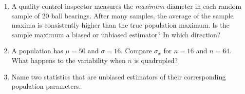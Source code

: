 \documentclass[10pt]{article}
\begin{document}
\namedateperiod

\vspace{0.15in}

\begin{enumerate}
  \item A quality control inspector measures the \emph{maximum} diameter in each random
        sample of 20 ball bearings. After many samples, the average of the sample maxima
        is consistently higher than the true population maximum. Is the sample maximum
        a biased or unbiased estimator? In which direction?

  \item A population has $\mu = 50$ and $\sigma = 16$. Compare $\sigma_{\bar{x}}$ for
        $n = 16$ and $n = 64$. What happens to the variability when $n$ is quadrupled?
        \vspace{0.7in}

  \item Name two statistics that are unbiased estimators of their corresponding
        population parameters.
\end{enumerate}
\end{document}
